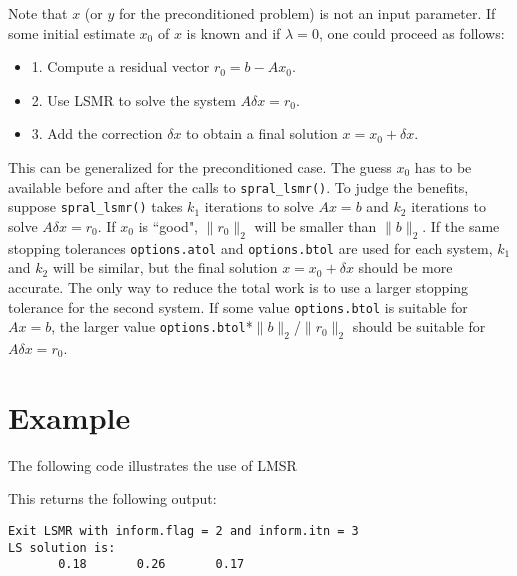      Note that $x$ (or $y$ for the preconditioned problem) is not an input
     parameter.
     If some initial estimate $x_0$ of $x$ is known and if $\lambda = 0$,
     one could proceed as follows:
    \begin{itemize} 
     \item 1. Compute a residual vector     $r_0 = b - Ax_0$.
    \item 2. Use LSMR to solve the system  $A \delta x = r_0$.
    \item 3. Add the correction $\delta x$ to obtain a final solution $x = x_0 + \delta x$.
    \end{itemize}
     This can be generalized for the preconditioned case.
     The guess $x_0$ has to be available before and after the calls
     to {\tt spral\_lsmr()}.  To judge the benefits, suppose {\tt spral\_lsmr()} takes $k_1$ iterations
     to solve $Ax = b$ and $k_2$ iterations to solve $A \delta x = r_0$.
     If $x_0$ is ``good", $\|r_0\|_2$ will be smaller than $\|b\|_2$.
     If the same stopping tolerances {\tt options.atol} and {\tt options.btol}
      are used for each
     system, $k_1$ and $k_2$ will be similar, but the final solution $x = x_0 + \delta x$
     should be more accurate.  The only way to reduce the total work
     is to use a larger stopping tolerance for the second system.
     If some value {\tt options.btol} is suitable for $Ax=b$, the larger value
     {\tt options.btol}*$\|b\|_2$/$\|r_0\|_2$  should be suitable for $A \delta x = r_0$.
    




\section{Example}
The following code illustrates the use of LMSR



This returns the following output:

\begin{verbatim}
Exit LSMR with inform.flag = 2 and inform.itn = 3
LS solution is:
       0.18       0.26       0.17
\end{verbatim}

\begin{funders}
\end{funders}
